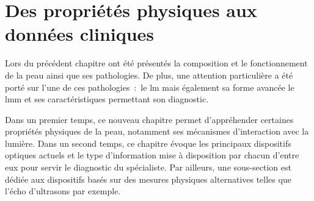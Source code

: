 \renewcommand{\thechapter}{\arabic{chapter}}
\setcounter{chapter}{1}

\chapter{Des propriétés physiques aux données cliniques}
\label{chap:chapter_2}
\chapterintro
Lors du précédent chapitre ont été présentés la composition et le fonctionnement de la peau ainsi que ses pathologies. De plus, une attention particulière a été porté sur l'une de ces pathologies~:~le \acrlong{lm} mais également sa forme avancée le \acrlong{lmm} et ses caractéristiques permettant son diagnostic.\par

Dans un premier temps, ce nouveau chapitre permet d'appréhender certaines propriétés physiques de la peau, notamment ses mécanismes d'interaction avec la lumière. Dans un second temps, ce chapitre évoque les principaux dispositifs optiques actuels et le type d'information mise à disposition par chacun d'entre eux pour servir le diagnostic du spécialiste. Par ailleurs, une sous-section est dédiée aux dispositifs basés sur des mesures physiques alternatives telles que l'écho d'ultrasons par exemple.\par
\newpage

